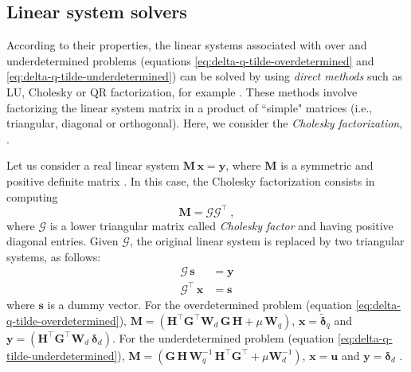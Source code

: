 \subsection{Linear system solvers}
\label{subsec:linear-system-solvers}

According to their properties, the linear systems associated with over and underdetermined problems 
(equations \ref{eq:delta-q-tilde-overdetermined} and \ref{eq:delta-q-tilde-underdetermined}) can be solved 
by using \textit{direct methods} such as LU, Cholesky or QR factorization, for example \citep[][sections 3.2, 4.2 and 5.2]{golub-vanloan2013}.
These methods involve factorizing the linear system matrix in a product of ``simple" matrices 
(i.e., triangular, diagonal or orthogonal). Here, we consider the \textit{Cholesky factorization}, 
\citep[][p. 163]{golub-vanloan2013}.

Let us consider a real linear system $\mathbf{M} \, \mathbf{x} = \mathbf{y}$, where 
$\mathbf{M}$ is a symmetric and positive definite matrix \citep[][p. 159]{golub-vanloan2013}.
In this case, the Cholesky factorization consists in computing 
\begin{equation}
	\mathbf{M} = \boldsymbol{\mathcal{G}} \boldsymbol{\mathcal{G}}^{\top} \: ,
	\label{eq:Cholesky-factorization}
\end{equation}
where $\boldsymbol{\mathcal{G}}$ is a lower triangular matrix called \textit{Cholesky factor} and having positive diagonal entries.
Given $\boldsymbol{\mathcal{G}}$, the original linear system is replaced by two triangular systems, as follows:
\begin{equation}
	\begin{split}
		\boldsymbol{\mathcal{G}} \, \mathbf{s} &= \mathbf{y} \\
		\boldsymbol{\mathcal{G}}^{\top} \, \mathbf{x} &= \mathbf{s}
	\end{split}
	\label{eq:Cholesky-solver}
\end{equation}
where $\mathbf{s}$ is a dummy vector.
For the overdetermined problem (equation \ref{eq:delta-q-tilde-overdetermined}), 
$\mathbf{M} = \left( \mathbf{H}^{\top} \mathbf{G}^{\top} \mathbf{W}_{d} \, \mathbf{G} \, \mathbf{H} + 
\mu \, \mathbf{W}_{q} \right)$, $\mathbf{x} = \tilde{\boldsymbol{\delta}}_{q}$ and
$\mathbf{y} = \left( \mathbf{H}^{\top} \mathbf{G}^{\top} \mathbf{W}_{d} \: \boldsymbol{\delta}_{d} \right)$.
For the underdetermined problem (equation \ref{eq:delta-q-tilde-underdetermined}),
$\mathbf{M} = \left( \mathbf{G} \, \mathbf{H} \, \mathbf{W}_{q}^{-1} \,
\mathbf{H}^{\top}\mathbf{G}^{\top} + \mu \mathbf{W}_{d}^{-1} \right)$, $\mathbf{x} = \mathbf{u}$ and
$\mathbf{y} = \boldsymbol{\delta}_{d}$ .

